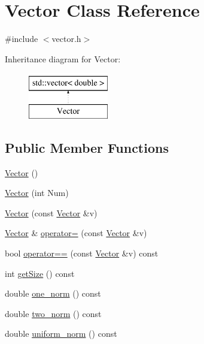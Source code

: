 \hypertarget{class_vector}{}\section{Vector Class Reference}
\label{class_vector}


{\ttfamily \#include $<$vector.\+h$>$}

Inheritance diagram for Vector\+:\begin{figure}[H]
\begin{center}
\leavevmode
\includegraphics[height=2.000000cm]{class_vector}
\end{center}
\end{figure}
\subsection*{Public Member Functions}
\begin{DoxyCompactItemize}
\item 
\hyperlink{class_vector_a6f80c73b5f18dcf3f8e36065bdc8b9e5}{Vector} ()
\item 
\hyperlink{class_vector_acbdf66550f2caa0a64e0b356fb63a277}{Vector} (int Num)
\item 
\hyperlink{class_vector_a5f04e343b7306ad11f8a82c89b486764}{Vector} (const \hyperlink{class_vector}{Vector} \&v)
\item 
\hyperlink{class_vector}{Vector} \& \hyperlink{class_vector_ae48c467a9f65d60e2f7455aba4ca1239}{operator=} (const \hyperlink{class_vector}{Vector} \&v)
\item 
bool \hyperlink{class_vector_ade5fbd0cd01b034d1907e0c93433320c}{operator==} (const \hyperlink{class_vector}{Vector} \&v) const
\item 
int \hyperlink{class_vector_afbb7966ec4107c43ec15cccc47fcaef7}{get\+Size} () const
\item 
double \hyperlink{class_vector_a6752a90058ddef427ca6aed12946a737}{one\+\_\+norm} () const
\item 
double \hyperlink{class_vector_a4f501290a50d057bb6c57ea64d7e70a4}{two\+\_\+norm} () const
\item 
double \hyperlink{class_vector_a50b72131eaf3698a9876d99ab6912a32}{uniform\+\_\+norm} () const
\end{DoxyCompactItemize}


